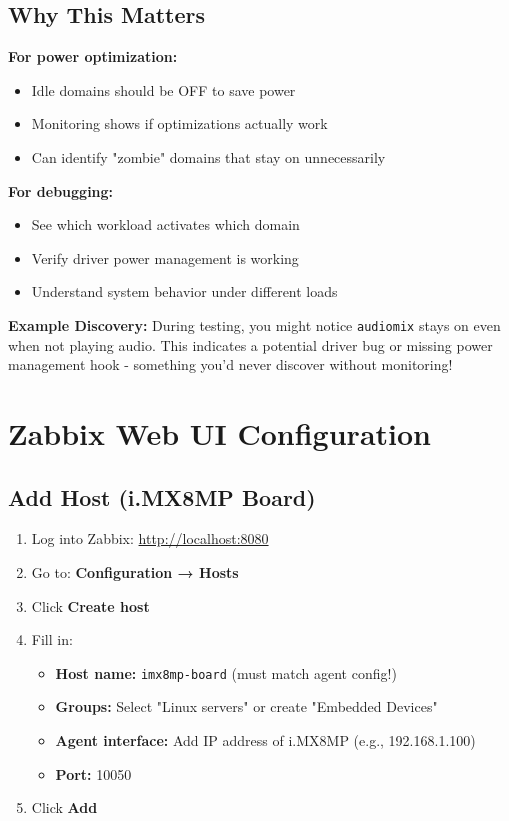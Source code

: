 \documentclass[12pt,a4paper]{report}
\begin{document}
\subsection{Why This Matters}

\textbf{For power optimization:}
\begin{itemize}
    \item Idle domains should be OFF to save power
    \item Monitoring shows if optimizations actually work
    \item Can identify "zombie" domains that stay on unnecessarily
\end{itemize}

\textbf{For debugging:}
\begin{itemize}
    \item See which workload activates which domain
    \item Verify driver power management is working
    \item Understand system behavior under different loads
\end{itemize}

\begin{important}
\textbf{Example Discovery:} During testing, you might notice \texttt{audiomix} stays on even when not playing audio. This indicates a potential driver bug or missing power management hook - something you'd never discover without monitoring!
\end{important}

\section{Zabbix Web UI Configuration}

\subsection{Add Host (i.MX8MP Board)}

\begin{enumerate}
    \item Log into Zabbix: \url{http://localhost:8080}
    \item Go to: \textbf{Configuration → Hosts}
    \item Click \textbf{Create host}
    \item Fill in:
    \begin{itemize}
        \item \textbf{Host name:} \texttt{imx8mp-board} (must match agent config!)
        \item \textbf{Groups:} Select "Linux servers" or create "Embedded Devices"
        \item \textbf{Agent interface:} Add IP address of i.MX8MP (e.g., 192.168.1.100)
        \item \textbf{Port:} 10050
    \end{itemize}
    \item Click \textbf{Add}
\end{enumerate}
\end{document}
